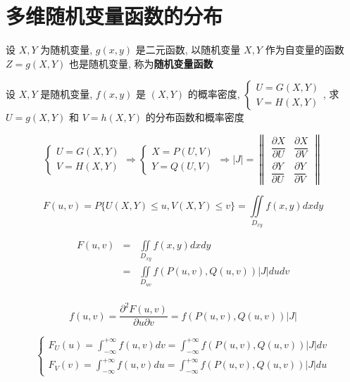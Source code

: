 \section{多维随机变量函数的分布}
\begin{definition}[二维随机变量函数]
	设 $X,Y$ 为随机变量, $g(x,y)$ 是二元函数, 以随机变量 $X,Y$ 作为自变量的函数 $Z = g(X,Y)$ 也是随机变量, 称为\textbf{随机变量函数}
\end{definition}
\begin{theorem}[随机变量函数分布函数和概率密度]
	设 $X,Y$ 是随机变量, $f(x,y)$ 是 $(X,Y)$ 的概率密度, 
	$\begin{cases}
		U = G(X,Y)\\
		V = H(X,Y)
	\end{cases}$, 求 $U = g(X,Y)$ 和 $V = h(X,Y)$ 的分布函数和概率密度

	$$\begin{cases}
		U = G(X,Y)\\
		V = H(X,Y)
	\end{cases}\Rightarrow 
	\begin{cases}
		X = P(U,V)\\
		Y = Q(U,V)
	\end{cases}\Rightarrow
	\big|J\big| = 
	\begin{Vmatrix}
		\dfrac{\partial X}{\partial U} & \dfrac{\partial X}{\partial V}\\
		\dfrac{\partial Y}{\partial U} & \dfrac{\partial Y}{\partial V}
	\end{Vmatrix}$$

	$$F(u,v) = P\{U(X,Y)\leq u, V(X,Y)\leq v\} = \iint\limits_{D_{xy}}f(x,y)dxdy$$
	
	\begin{eqnarray*}
		F(u,v) & = & \iint\limits_{D_{xy}}f(x,y)dxdy\\
			   & = & \iint\limits_{D_{uv}}f(P(u,v),Q(u,v))\big|J\big|dudv\\
	\end{eqnarray*}

	$$f(u,v) = \dfrac{\partial^{2}F(u,v)}{\partial u \partial v} = f(P(u,v),Q(u,v))\big|J\big|$$

	$$\begin{cases}
		F_{U}(u) = \int_{-\infty}^{+\infty}f(u,v)dv = \int_{-\infty}^{+\infty}f(P(u,v),Q(u,v))\big|J\big|dv\\
		F_{V}(v) = \int_{-\infty}^{+\infty}f(u,v)du = \int_{-\infty}^{+\infty}f(P(u,v),Q(u,v))\big|J\big|du
	\end{cases}$$
\end{theorem}

